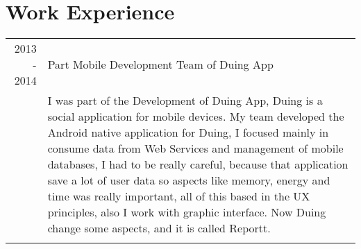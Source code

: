 \documentclass[a4paper,10pt]{article} %
\begin{document}

\section{Work Experience}

\begin{tabular}{r|p{11cm}}

\textsc{2013 - 2014} & Part Mobile Development Team of Duing App\\
& \footnotesize{I was part of the Development of Duing App, Duing is a social application for mobile devices.
My team developed the Android native application for Duing, I focused mainly in consume data from Web Services and management of mobile databases, I had to be really careful, because that application save a lot of user data so aspects like memory, energy and time was really important, all of this based in the UX principles, also I work with graphic interface. Now Duing change some aspects, and it is called Reportt.}\\
\multicolumn{2}{c}{} \\
\end{tabular}



\end{document}
